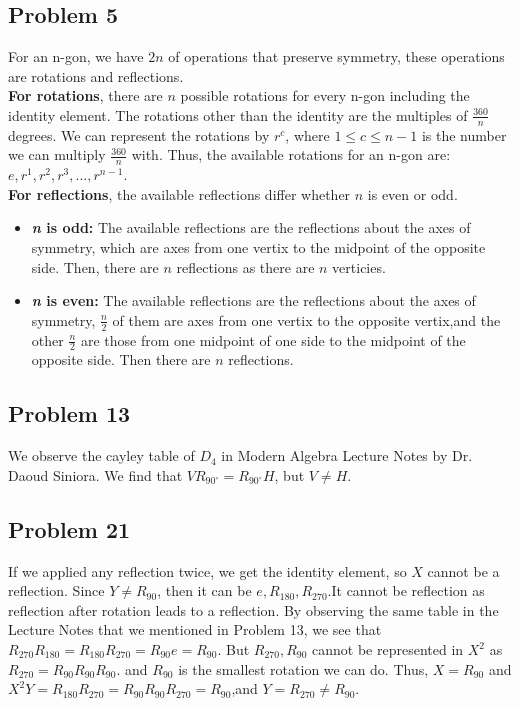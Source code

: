 \documentclass[a4paper,12pt]{article}
\begin{document}
\subsection*{Problem 5}
For an n-gon, we have $2n$ of operations that preserve symmetry, these operations are rotations and reflections.\\
\textbf{For rotations}, there are $n$ possible rotations for every n-gon including the identity element. The rotations other than the identity are the multiples of $\frac{360}{n}$ degrees. We can represent the rotations by $r^c$, where $1\le c\le n-1$ is the number we can multiply $\frac{360}{n}$ with. Thus, the available rotations for an n-gon are: $e,r^1, r^2, r^3,...,r^{n-1}$.\\
\textbf{For reflections}, the available reflections differ whether $n$ is even or odd.
\begin{itemize}
    \item []\textbf{\textit{n} is odd:}
    The available reflections are the reflections about the axes of symmetry, which are axes from one vertix to the midpoint of the opposite side. Then, there are $n$ reflections as there are $n$ verticies.
    \item []\textbf{\textit{n} is even:}
    The available reflections are the reflections about the axes of symmetry, $\frac{n}{2}$ of them are axes from one vertix to the opposite vertix,and the other $\frac{n}{2}$ are those from one midpoint of one side to the midpoint of the opposite side. Then there are $n$ reflections.
\end{itemize}
\subsection*{Problem 13}
We observe the cayley table of $D_4$ in Modern Algebra Lecture Notes by Dr. Daoud Siniora. We find that $VR_{90^\circ} = R_{90^\circ}H$, but $V \ne H.$
\subsection*{Problem 21}
If we applied any reflection twice, we get the identity element, so $X$ cannot be a reflection. Since $Y \ne R_{90}$, then it can be $e,R_{180}, R_{270}$.It cannot be reflection as reflection after rotation leads to a reflection. By observing the same table in the Lecture Notes that we mentioned in Problem 13, we see that $R_{270}R_{180}=R_{180}R_{270}=R_{90}e=R_{90}$. But $R_{270},R_{90}$ cannot be represented in $X^2$ as $R_{270}=R_{90}R_{90}R_{90}.$ and $R_{90}$ is the smallest rotation we can do. Thus, $X=R_{90}$ and $X^2Y=R_{180}R_{270}=R_{90}R_{90}R_{270}=R_{90}$,and $Y=R_{270} \ne R_{90}.$
\end{document}
